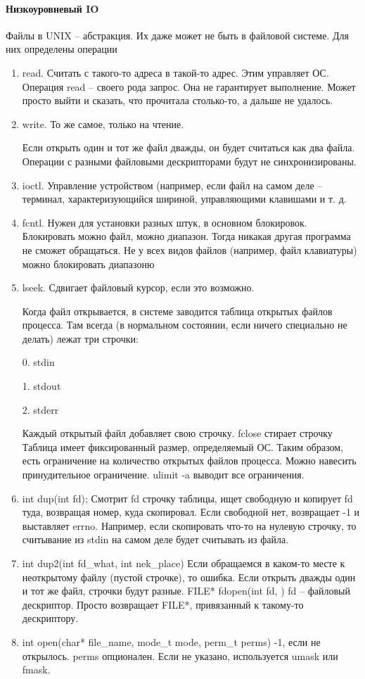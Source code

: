 \documentclass[a4paper,10pt]{article}
\begin{document}
\paragraph{Низкоуровневый IO}
Файлы в UNIX -- абстракция. Их даже может не быть в файловой системе. Для них определены операции 
\begin{enumerate}
\item read. Считать с такого-то адреса в такой-то адрес. Этим управляет ОС. Операция read -- своего рода запрос. Она не гарантирует выполнение. Может просто выйти и сказать, что прочитала столько-то, а дальше не удалось.
\item write. То же самое, только на чтение.

Если открыть один и тот же файл дважды, он будет считаться как два файла. Операции с разными файловыми дескрипторами будут не синхронизированы. 
\item ioctl. Управление устройством (например, если файл на самом деле -- терминал, характеризующийся шириной, управляющими клавишами и т. д.
\item fcntl. Нужен для установки разных штук, в основном блокировок. Блокировать можно файл, можно диапазон. Тогда никакая другая программа не сможет обращаться. Не у всех видов файлов (например, файл клавиатуры) можно блокировать диапазоню
\item lseek. Сдвигает файловый курсор, если это возможно.

Когда файл открывается, в системе заводится таблица открытых файлов процесса. Там всегда (в нормальном состоянии, если ничего специально не делать) лежат три строчки:

0. stdin

1. stdout

2. stderr

Каждый открытый файл добавляет свою строчку. fclose стирает строчку
Таблица имеет фиксированный размер, определяемый ОС. Таким образом, есть ограничение на количество открытых файлов процесса. Можно навесить принудительное ограничение. 
ulimit -a выводит все ограничения.
\item int dup(int fd); Смотрит fd строчку таблицы, ищет свободную и копирует fd туда, возвращая номер, куда скопировал. Если свободной нет, возвращает -1 и выставляет errno.
Например, если скопировать что-то на нулевую строчку, то считывание из stdin на самом деле будет считывать из файла.
\item int dup2(int fd\_what, int nek\_place)
Если обращаемся в каком-то месте к неоткрытому файлу (пустой строчке), то ошибка. Если открыть дважды один и тот же файл, строчки будут разные.
FILE* fdopen(int fd, ) fd -- файловый дескриптор. Просто возвращает FILE*, привязанный к такому-то дескриптору.
\item int open(char* file\_name, mode\_t mode, perm\_t perms)
-1, если не открылось. 
perms опционален. Если не указано, используется umask или fmask.


\end{enumerate}
\end{document}
